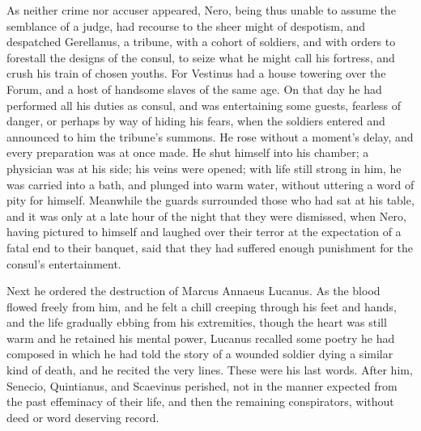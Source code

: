 
As neither crime nor accuser appeared, Nero, being thus unable to assume the semblance of a judge, had recourse to the sheer might of despotism, and despatched Gerellanus, a tribune, with a cohort of soldiers, and with orders to forestall the designs of the consul, to seize what he might call his fortress, and crush his train of chosen youths. For Vestinus had a house towering over the Forum, and a host of handsome slaves of the same age. On that day he had performed all his duties as consul, and was entertaining some guests, fearless of danger, or perhaps by way of hiding his fears, when the soldiers entered and announced to him the tribune's summons. He rose without a moment's delay, and every preparation was at once made. He shut himself into his chamber; a physician was at his side; his veins were opened; with life still strong in him, he was carried into a bath, and plunged into warm water, without uttering a word of pity for himself. Meanwhile the guards surrounded those who had sat at his table, and it was only at a late hour of the night that they were dismissed, when Nero, having pictured to himself and laughed over their terror at the expectation of a fatal end to their banquet, said that they had suffered enough punishment for the consul's entertainment.


Next he ordered the destruction of Marcus Annaeus Lucanus. As the blood flowed freely from him, and he felt a chill creeping through his feet and hands, and the life gradually ebbing from his extremities, though the heart was still warm and he retained his mental power, Lucanus recalled some poetry he had composed in which he had told the story of a wounded soldier dying a similar kind of death, and he recited the very lines. These were his last words. After him, Senecio, Quintianus, and Scaevinus perished, not in the manner expected from the past effeminacy of their life, and then the remaining conspirators, without deed or word deserving record.


